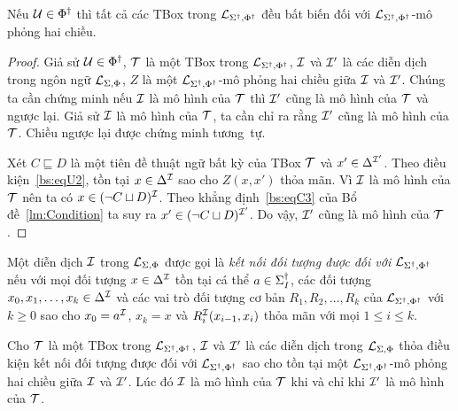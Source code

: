 \begin{Corollary}
	\label{co:TBoxInvariant}
	Nếu $\mathcal{U} \in \Phi^\dag$ thì tất cả các TBox trong $\mathcal{L}_{\Sigma^\dag,\Phi^\dag}$ đều bất biến đối với $\mathcal{L}_{\Sigma^\dag,\Phi^\dag}$-mô phỏng hai chiều.\myend
\end{Corollary}

\begin{proof}
	Giả sử $\mathcal{U} \in \Phi^\dag$, $\mathcal{T}$ là một TBox trong $\mathcal{L}_{\Sigma^\dag,\Phi^\dag}$, $\mathcal{I}$ và $\mathcal{I}'$ là các diễn dịch trong ngôn ngữ $\mathcal{L}_{\Sigma,\Phi}$, $Z$ là một $\mathcal{L}_{\Sigma^\dag,\Phi^\dag}$-mô phỏng hai chiều giữa $\mathcal{I}$ và $\mathcal{I}'$. Chúng ta cần chứng minh nếu $\mathcal{I}$ là mô hình của $\mathcal{T}$ thì $\mathcal{I}'$ cũng là mô hình của $\mathcal{T}$ và ngược lại. Giả sử $\mathcal{I}$ là mô hình của $\mathcal{T}$, ta cần chỉ ra rằng $\mathcal{I}'$ cũng là mô hình của $\mathcal{T}$. Chiều ngược lại được chứng minh tương~tự.
	
	Xét $C \sqsubseteq D$ là một tiên đề thuật ngữ bất kỳ của TBox $\mathcal{T}$ và $x' \in \Delta^{\mathcal{I}'}$. Theo điều kiện~\eqref{bs:eqU2}, tồn tại $x \in \Delta^{\mathcal{I}}$ sao cho $Z(x, x')$ thỏa mãn. Vì $\mathcal{I}$ là mô hình của $\mathcal{T}$ nên ta có $x \in (\neg C \sqcup D)^{\mathcal{I}}$. Theo khẳng định~\eqref{bs:eqC3} của Bổ đề~\ref{lm:Condition} ta suy ra $x' \in (\neg C \sqcup D)^{\mathcal{I}'}$. Do vậy, $\mathcal{I}'$ cũng là mô hình của $\mathcal{T}$.
\end{proof}

Một diễn dịch $\mathcal{I}$ trong $\mathcal{L}_{\Sigma,\Phi}$ được gọi là {\em kết nối đối tượng được đối với $\mathcal{L}_{\Sigma^\dag,\Phi^\dag}$} nếu với mọi đối tượng $x \in \Delta^{\mathcal{I}}$ tồn tại cá thể $a \in \Sigma^\dag_I$, các đối tượng $x_0, x_1, \ldots, x_k \in \Delta^{\mathcal{I}}$ và các vai trò đối tượng cơ bản $R_1, R_2, \ldots, R_k$ của $\mathcal{L}_{\Sigma^\dag,\Phi^\dag}$ với $k \geq 0$ sao cho $x_0 = a^{\mathcal{I}}$, $x_k = x$ và $R_i^{\mathcal{I}}(x_{i-1}, x_i)$ thỏa mãn với mọi $1 \leq i \leq k$.

\begin{Theorem}
\label{th:TBoxInvariant}
	Cho $\mathcal{T}$ là một TBox trong $\mathcal{L}_{\Sigma^\dag,\Phi^\dag}$, $\mathcal{I}$ và $\mathcal{I}'$ là các diễn dịch trong $\mathcal{L}_{\Sigma,\Phi}$ thỏa điều kiện kết nối đối tượng được đối với $\mathcal{L}_{\Sigma^\dag,\Phi^\dag}$ sao cho tồn tại một $\mathcal{L}_{\Sigma^\dag,\Phi^\dag}$-mô phỏng hai chiều giữa $\mathcal{I}$ và $\mathcal{I}'$. Lúc đó $\mathcal{I}$ là mô hình của $\mathcal{T}$ khi và chỉ khi $\mathcal{I}'$ là mô hình của $\mathcal{T}$.\myend
\end{Theorem}

